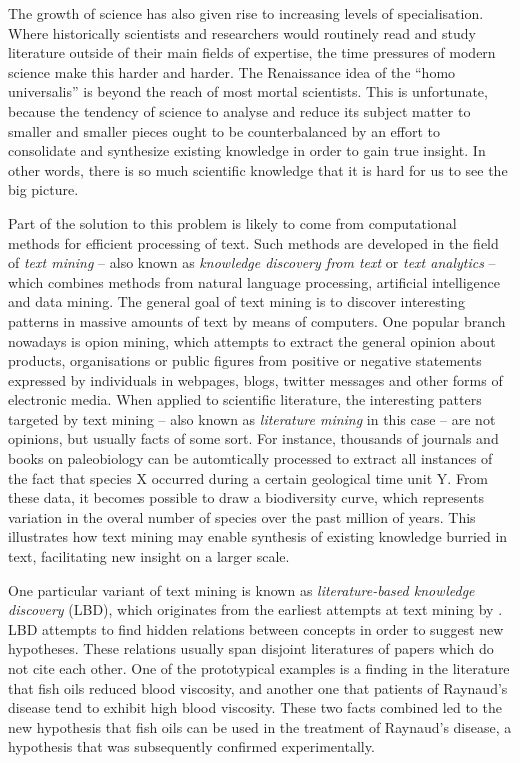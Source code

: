 The growth of science has also given rise to increasing levels of specialisation.
Where historically scientists and researchers would routinely read and study literature outside of their main fields of expertise, the time pressures of modern science make this harder and harder.  
The Renaissance idea of the ``homo universalis'' is beyond the reach of most mortal scientists.  
This is unfortunate, because the tendency of science to analyse and reduce its subject matter to smaller and smaller pieces ought to be counterbalanced by an effort to consolidate and synthesize existing knowledge in order to gain true insight.    
In other words, there is so much scientific knowledge that it is hard for us to see the big picture.

Part of the solution to this problem is likely to come from computational methods for efficient processing of text.
Such methods are developed in the field of \emph{text mining} -- also known as \emph{knowledge discovery from text} or \emph{text analytics} -- which combines methods from natural language processing, artificial intelligence and data mining.
The general goal of text mining is to discover interesting patterns in massive amounts of text by means of computers.
One popular branch nowadays is opion mining, which attempts to extract the general opinion about products, organisations or public figures from positive or negative statements expressed by individuals in webpages, blogs, twitter messages and other forms of electronic media.
When applied to scientific literature, the interesting patters targeted by text mining -- also known as \emph{literature mining} in this case -- are not opinions, but usually facts of some sort.
For instance, thousands of journals and books on paleobiology can be automtically processed to extract all instances of the fact that species X occurred during a certain geological time unit Y.
From these data, it becomes possible to draw a biodiversity curve, which represents variation in the overal number of species over the past million of years.
This illustrates how text mining may enable synthesis of existing knowledge burried in text, facilitating new insight on a larger scale.  

One particular variant of text mining is known as\emph{ literature-based knowledge discovery} (LBD), which originates from the earliest attempts at text mining by \citet{swa86a}.
LBD attempts to find hidden relations between concepts in order to suggest new hypotheses.
These relations usually span disjoint literatures of papers which do not cite each other. 
One of the prototypical examples is a finding in the literature that fish oils reduced blood viscosity, and another one that patients of Raynaud's disease tend to exhibit high blood viscosity. 
These two facts combined led to the new hypothesis that fish oils can be used in the treatment of Raynaud's disease, a hypothesis that was subsequently confirmed experimentally.

